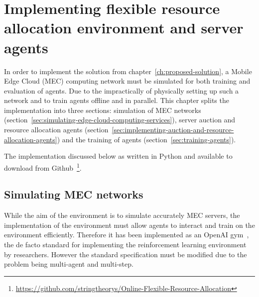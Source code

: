 

\chapter{Implementing flexible resource allocation environment and server agents}\label{ch:implementation-of-the-solution}
In order to implement the solution from chapter~\ref{ch:proposed-solution}, a Mobile Edge Cloud (MEC) computing network
must be simulated for both training and evaluation of agents. Due to the impractically of physically setting up
such a network and to train agents offline and in parallel. This chapter splits the implementation into three sections:
simulation of MEC networks (section~\ref{sec:simulating-edge-cloud-computing-services}), server auction and resource
allocation agents (section~\ref{sec:implementing-auction-and-resource-allocation-agents}) and the training of agents
(section~\ref{sec:training-agents}).

The implementation discussed below as written in Python and available to download from
Github~\footnote{\url{https://github.com/stringtheorys/Online-Flexible-Resource-Allocation}}.

\section{Simulating MEC networks}\label{sec:simulating-mec-networks}
While the aim of the environment is to simulate accurately MEC servers, the implementation of the environment must
allow agents to interact and train on the environment efficiently. Therefore it has been implemented
as an OpenAI gym~\citep{openaigym}, the de facto standard for implementing the reinforcement learning environment by
researchers. However the standard specification must be modified due to the problem being multi-agent and multi-step.


